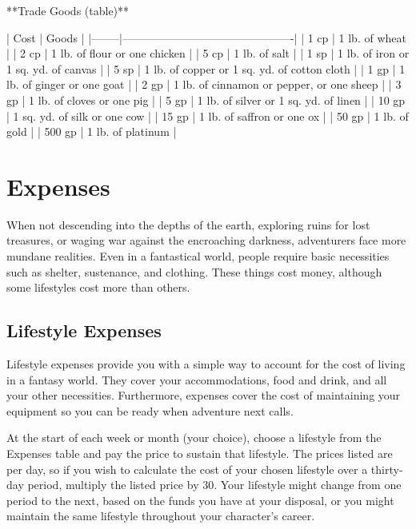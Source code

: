 **Trade Goods (table)**

| Cost   | Goods                                        |
|--------|----------------------------------------------|
| 1 cp   | 1 lb. of wheat                               |
| 2 cp   | 1 lb. of flour or one chicken                |
| 5 cp   | 1 lb. of salt                                |
| 1 sp   | 1 lb. of iron or 1 sq. yd. of canvas         |
| 5 sp   | 1 lb. of copper or 1 sq. yd. of cotton cloth |
| 1 gp   | 1 lb. of ginger or one goat                  |
| 2 gp   | 1 lb. of cinnamon or pepper, or one sheep    |
| 3 gp   | 1 lb. of cloves or one pig                   |
| 5 gp   | 1 lb. of silver or 1 sq. yd. of linen        |
| 10 gp  | 1 sq. yd. of silk or one cow                 |
| 15 gp  | 1 lb. of saffron or one ox                   |
| 50 gp  | 1 lb. of gold                                |
| 500 gp | 1 lb. of platinum                            |

\section{Expenses}
When not descending into the depths of the earth, exploring ruins for lost treasures, or waging war against the encroaching darkness, adventurers face more mundane realities. Even in a fantastical world, people require basic necessities such as shelter, sustenance, and clothing. These things cost money, although some lifestyles cost more than others.

\subsection{Lifestyle Expenses}

Lifestyle expenses provide you with a simple way to account for the cost of living in a fantasy world. They cover your accommodations, food and drink, and all your other necessities. Furthermore, expenses cover the cost of maintaining your equipment so you can be ready when adventure next calls.

At the start of each week or month (your choice), choose a lifestyle from the Expenses table and pay the price to sustain that lifestyle. The prices listed are per day, so if you wish to calculate the cost of your chosen lifestyle over a thirty-day period, multiply the listed price by 30. Your lifestyle might change from one period to the next, based on the funds you have at your disposal, or you might maintain the same lifestyle throughout your character's career.

